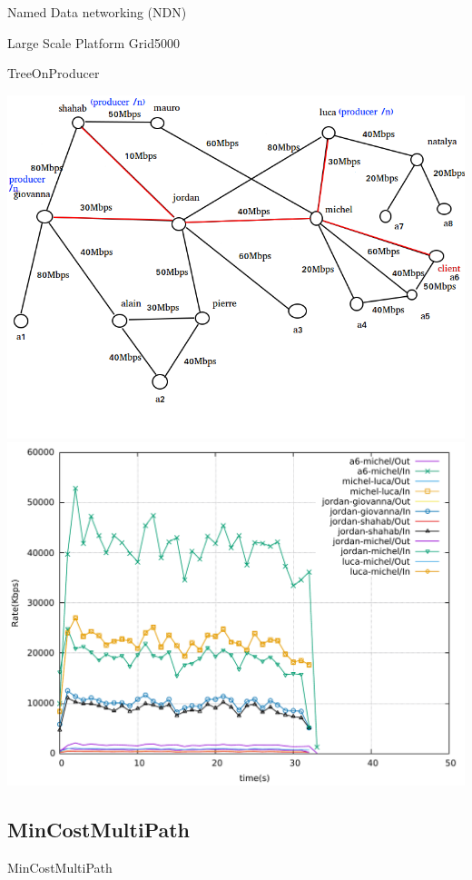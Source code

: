 \documentclass[8pt]{beamer}
\newcommand{\1}{\mathbbm 1}
\begin{document}
\begin{frame}{Named Data networking (NDN)}
\begin{frame}{Large Scale Platform Grid5000}
\begin{frame}{TreeOnProducer}
{\includegraphics[scale=0.22]{figures/TreeOnProducer_big.png} 
\includegraphics[scale=0.21]{figures/TreeOnProducer_big.pdf} 

}



\end{frame}


\subsection{MinCostMultiPath}

\begin{frame}{MinCostMultiPath}


\end{frame}
\end{frame}
\end{frame}
\end{document}
